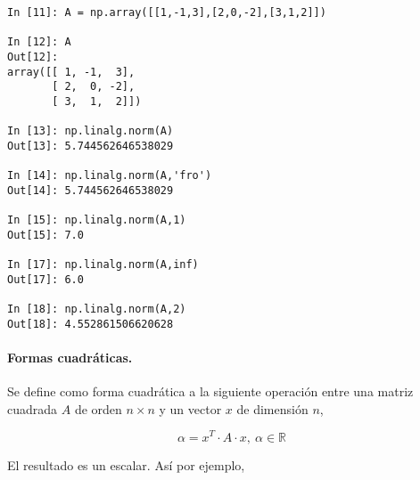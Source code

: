 \begin{center}
    \begin{minipage}{0.5\textwidth}
    \begin{verbatim}
In [11]: A = np.array([[1,-1,3],[2,0,-2],[3,1,2]])

In [12]: A
Out[12]: 
array([[ 1, -1,  3],
       [ 2,  0, -2],
       [ 3,  1,  2]])

In [13]: np.linalg.norm(A)
Out[13]: 5.744562646538029

In [14]: np.linalg.norm(A,'fro')
Out[14]: 5.744562646538029

In [15]: np.linalg.norm(A,1)
Out[15]: 7.0

In [17]: np.linalg.norm(A,inf)
Out[17]: 6.0

In [18]: np.linalg.norm(A,2)
Out[18]: 4.552861506620628
\end{verbatim}
\end{minipage}
\end{center}

\begin{paracol}{2}
\paragraph{Formas cuadráticas.} Se define como forma cuadrática a la siguiente operación entre una matriz cuadrada $A$ de orden $n \times n$ y un vector $x$ de dimensión $n$,
\end{paracol}
\begin{equation*}
\alpha=x^T\cdot A \cdot x, \ \alpha \in \mathbb{R}
\end{equation*}

\begin{paracol}{2}
El resultado es un escalar. Así por ejemplo,
\end{paracol}

